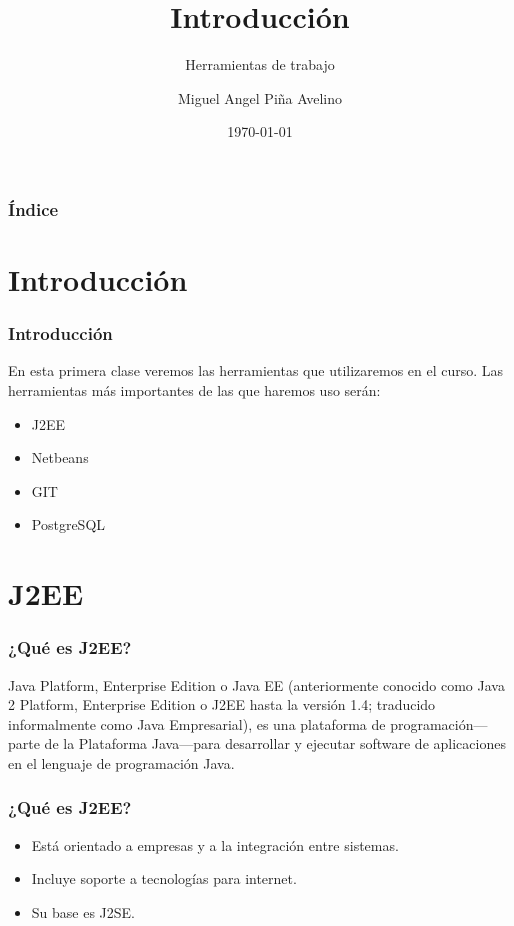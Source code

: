 \documentclass{beamer}
\title[Laboratorio]{Introducción}
\subtitle{Herramientas de trabajo}
\author[Miguel]{Miguel Angel Piña Avelino}
\institute[UNAM]{
  Facultad de Ciencias, UNAM
}
\date{\today}
\begin{document}
\frame{\titlepage}

\begin{frame}
  \frametitle{Índice}
  \tableofcontents
\end{frame}


\section{Introducción}
\begin{frame}
  \frametitle{Introducción}
  En esta primera clase veremos las herramientas que utilizaremos en el curso.
  Las herramientas más importantes de las que haremos uso serán:
  \begin{itemize}
    \item J2EE
    \item Netbeans
    \item GIT
    \item PostgreSQL
  \end{itemize}
\end{frame}
\section{J2EE}

\begin{frame}
  \frametitle{¿Qué es J2EE?}
  Java Platform, Enterprise Edition o Java EE (anteriormente conocido como Java
  2 Platform, Enterprise Edition o J2EE hasta la versión 1.4; traducido
  informalmente como Java Empresarial), es una plataforma de programación—parte
  de la Plataforma Java—para desarrollar y ejecutar software de aplicaciones en
  el lenguaje de programación Java.
\end{frame}

\begin{frame}
  \frametitle{¿Qué es J2EE?}
  \begin{itemize}
    \item Está orientado a empresas y a la integración entre sistemas.
    \item Incluye soporte a tecnologías para internet.
    \item Su base es J2SE.
  \end{itemize}
\end{frame}
\end{document}
